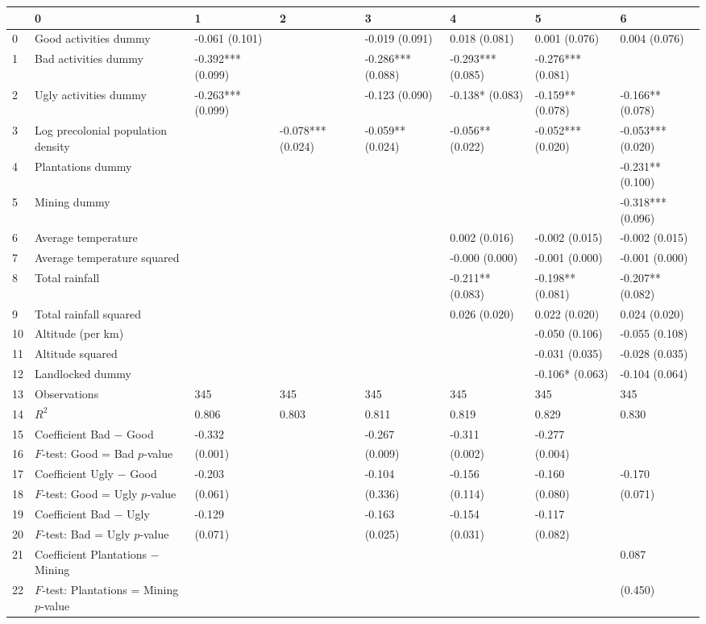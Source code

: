 \begin{tabular}{llllllll}
\toprule
 & 0 & 1 & 2 & 3 & 4 & 5 & 6 \\
\midrule
0 & Good activities dummy & -0.061
(0.101) &  & -0.019
(0.091) & 0.018
(0.081) & 0.001
(0.076) & 0.004
(0.076) \\
1 & Bad activities dummy & -0.392***
(0.099) &  & -0.286***
(0.088) & -0.293***
(0.085) & -0.276***
(0.081) &  \\
2 & Ugly activities dummy & -0.263***
(0.099) &  & -0.123
(0.090) & -0.138*
(0.083) & -0.159**
(0.078) & -0.166**
(0.078) \\
3 & Log precolonial population density &  & -0.078***
(0.024) & -0.059**
(0.024) & -0.056**
(0.022) & -0.052***
(0.020) & -0.053***
(0.020) \\
4 & Plantations dummy &  &  &  &  &  & -0.231**
(0.100) \\
5 & Mining dummy &  &  &  &  &  & -0.318***
(0.096) \\
6 & Average temperature &  &  &  & 0.002
(0.016) & -0.002
(0.015) & -0.002
(0.015) \\
7 & Average temperature squared &  &  &  & -0.000
(0.000) & -0.001
(0.000) & -0.001
(0.000) \\
8 & Total rainfall &  &  &  & -0.211**
(0.083) & -0.198**
(0.081) & -0.207**
(0.082) \\
9 & Total rainfall squared &  &  &  & 0.026
(0.020) & 0.022
(0.020) & 0.024
(0.020) \\
10 & Altitude (per km) &  &  &  &  & -0.050
(0.106) & -0.055
(0.108) \\
11 & Altitude squared &  &  &  &  & -0.031
(0.035) & -0.028
(0.035) \\
12 & Landlocked dummy &  &  &  &  & -0.106*
(0.063) & -0.104
(0.064) \\
13 & Observations & 345 & 345 & 345 & 345 & 345 & 345 \\
14 & $R^2$ & 0.806 & 0.803 & 0.811 & 0.819 & 0.829 & 0.830 \\
15 & Coefficient Bad − Good & -0.332 &  & -0.267 & -0.311 & -0.277 &  \\
16 & $F$‑test: Good = Bad $p$‑value & (0.001) &  & (0.009) & (0.002) & (0.004) &  \\
17 & Coefficient Ugly − Good & -0.203 &  & -0.104 & -0.156 & -0.160 & -0.170 \\
18 & $F$‑test: Good = Ugly $p$‑value & (0.061) &  & (0.336) & (0.114) & (0.080) & (0.071) \\
19 & Coefficient Bad − Ugly & -0.129 &  & -0.163 & -0.154 & -0.117 &  \\
20 & $F$‑test: Bad = Ugly $p$‑value & (0.071) &  & (0.025) & (0.031) & (0.082) &  \\
21 & Coefficient Plantations − Mining &  &  &  &  &  & 0.087 \\
22 & $F$‑test: Plantations = Mining $p$‑value &  &  &  &  &  & (0.450) \\
\bottomrule
\end{tabular}
